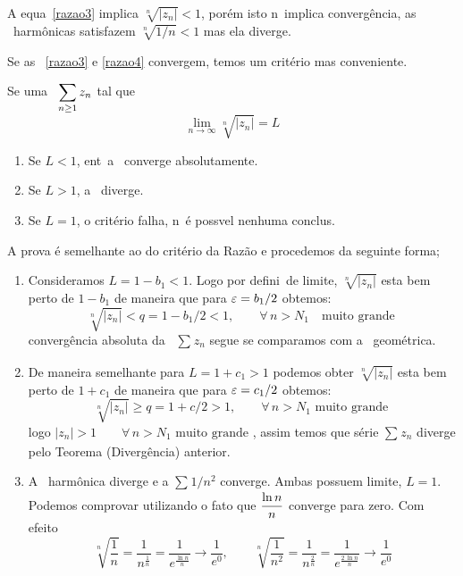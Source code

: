 \begin{obs}
A equa\cao\ \eqref{razao3} implica $\sqrt[n]{|z_n|}<1$, por\'em
isto n\ao\ implica converg\^encia, as \sers\ harm\^onicas
satisfazem $\sqrt[n]{1/n}<1$ mas ela diverge.
\end{obs}

Se as \sers\ \eqref{razao3} e \eqref{razao4} convergem, temos um
critério mas conveniente.

\begin{fteo}
Se uma \ser\ $\displaystyle{\sum_{n\geq 1}z_n}$  tal que
\begin{equation}\label{razao5}
  \lim_{n\to\infty} \sqrt[n]{|z_n|}=L
\end{equation}
\begin{enumerate}[label=\rm{(\alph*)},leftmargin=4em,ref=\rm{(\alph*)}]
  \item Se $L<1$, ent\ao\ a \ser\ converge absolutamente.
  \item Se $L>1$, a \ser\ diverge.
  \item Se $L=1$, o critério falha, n\ao\ \'e poss\ii vel nenhuma
  conclus\ao.
\end{enumerate}
\end{fteo}

\prova A prova \'e semelhante ao do critério  da Raz\~{a}o e procedemos da
seguinte forma;
\begin{enumerate}[label=\rm{(\arabic*)}]
  \item Consideramos $L=1-b_1<1$. Logo por defini\cao\ de
  limite, $\sqrt[n]{|z_n|}$ esta bem perto  de $1-b_1$ de maneira que para
  $\varepsilon=b_1/2$ obtemos:
\begin{equation*}
\sqrt[n]{|z_n|}< q=1-b_1/2<1,\qquad \forall\, n>N_1\quad \text{
muito grande }
\end{equation*}
converg\^encia absoluta da \ser\ $\sum_{}z_{n}$ segue
se comparamos com a \ser\ geom\'etrica.
  \item De maneira semelhante para $L=1+c_1>1$  podemos obter $\sqrt[n]{|z_n|}$ esta bem perto
   de $1+c_1$ de maneira que para  $\varepsilon=c_1/2$ obtemos:
   \begin{equation*}
  \sqrt[n]{|z_n|}\geq q=1+c/2>1,\qquad \forall\, n>N_1 \text{ muito grande }
\end{equation*}
logo $|z_n|>1 \qquad \forall\, n>N_1 \text{ muito grande }$, assim
temos que série $\sum_{}z_{n}$ diverge pelo Teorema
(Diverg\^encia) anterior.
  \item A \ser\ harm\^onica  diverge e a \ser $\sum_{}1/n^{2}$ converge. Ambas
  possuem limite, $L=1$. Podemos comprovar utilizando o  fato que $\displaystyle{\frac{\ln n}{n}}$
  converge para zero. Com efeito
\begin{equation*}
 \sqrt[n]{\frac{1}{n}}=\frac{1}{n^{\frac{1}{n}}}=\frac{1}{e^\frac{\ln n}{n}}\to
 \frac{1}{e^0},\qquad \sqrt[n]{\frac{1}{n^2}}=\frac{1}{n^{\frac{2}{n}}}=
 \frac{1}{e^\frac{2\,\ln n}{n}}\to \frac{1}{e^0}
\end{equation*}
\end{enumerate}


